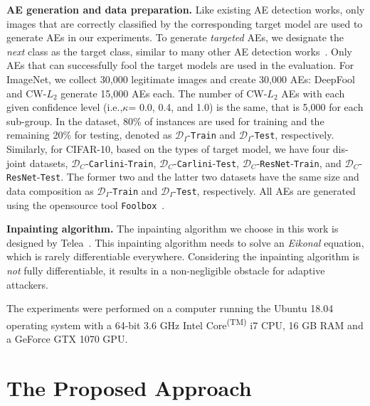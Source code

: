 \documentclass[sigconf]{acmart}
\begin{document}
\vspace{3pt}
\noindent \textbf{AE generation and data preparation.}
Like existing AE detection works, only images that are correctly classified
by the corresponding target model are used to generate AEs in our experiments. To generate \emph{targeted} AEs, we designate the \textit{next} class as the target 
class, similar to many other AE detection works~\cite{ma2019nic,xu2017feature,zuo2019l0}.  
Only AEs that can successfully fool the target models
are used in the evaluation. For ImageNet, we collect 30,000 legitimate images
and create 30,000 AEs: DeepFool and CW-$L_2$ generate 15,000 AEs each. 
The number of  CW-$L_2$
AEs with each given confidence level (i.e.,$\kappa$= 0.0, 0.4, and 1.0) is the same, that is 5,000 for each sub-group. In the dataset, 80\% of instances are used for training and the remaining 20\% for testing, denoted as $\mathcal{D}_I$-\texttt{Train} and $\mathcal{D}_I$-\texttt{Test}, respectively. Similarly, for CIFAR-10, based on the types of target model, we have four dis-joint datasets, $\mathcal{D}_C$-\texttt{Carlini}-\texttt{Train}, $\mathcal{D}_C$-\texttt{Carlini}-\texttt{Test}, $\mathcal{D}_C$-\texttt{ResNet}-\texttt{Train}, and $\mathcal{D}_C$-\texttt{ResNet}-\texttt{Test}. The former two and the latter two datasets have the same size and data composition as $\mathcal{D}_I$-\texttt{Train} and $\mathcal{D}_I$-\texttt{Test}, respectively. All AEs are generated using the opensource tool \texttt{Foolbox}~\cite{rauber2017foolbox}. 

\vspace{3pt}
\noindent \textbf{Inpainting algorithm.}
The inpainting algorithm we choose in this work is designed by Telea~\cite{telea2004image}.
This inpainting algorithm needs to solve an \emph{Eikonal} equation, which is rarely differentiable everywhere. 
Considering the inpainting algorithm  is \emph{not} fully differentiable, it results in a non-negligible obstacle for adaptive attackers.

\vspace{3pt}
The experiments were performed on a computer running
the Ubuntu 18.04 operating system with a 64-bit 3.6 GHz Intel\textsuperscript{\textregistered} Core\textsuperscript{(TM)} i7 CPU, 16 GB RAM and a GeForce\textsuperscript{\textregistered} GTX 1070 GPU.

\section{The Proposed Approach}\label{sec:sys}
\end{document}
